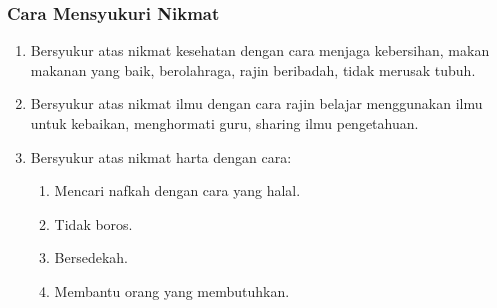 \subsubsection{Cara Mensyukuri Nikmat}
\begin{enumerate}
\item Bersyukur atas nikmat kesehatan dengan cara menjaga kebersihan, makan makanan yang baik, berolahraga, rajin beribadah, tidak merusak tubuh.
\item Bersyukur atas nikmat ilmu dengan cara rajin belajar menggunakan ilmu untuk kebaikan, menghormati guru, sharing ilmu pengetahuan.
\item Bersyukur atas nikmat harta dengan cara:
  \begin{enumerate}
  \item Mencari nafkah dengan cara yang halal.
  \item Tidak boros.
  \item Bersedekah.
  \item Membantu orang yang membutuhkan.
  \end{enumerate}
\end{enumerate}

